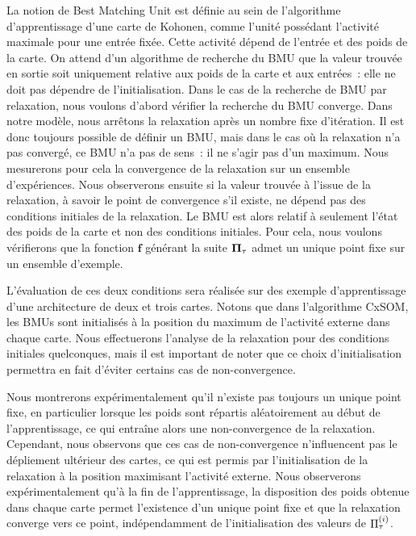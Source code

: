 \documentclass[../main]{subfiles}
\begin{document}
La notion de Best Matching Unit est définie au sein de l'algorithme d'apprentissage d'une carte de Kohonen, comme l'unité possédant l'activité maximale pour une entrée fixée. 
Cette activité dépend de l'entrée et des poids de la carte.
On attend d'un algorithme de recherche du BMU que la valeur trouvée en sortie soit uniquement relative aux poids de la carte et aux entrées~: elle ne doit pas dépendre de l'initialisation.
Dans le cas de la recherche de BMU par relaxation, nous voulons d'abord vérifier la recherche du BMU converge. 
Dans notre modèle, nous arrêtons la relaxation après un nombre fixe d'itération. Il est donc toujours possible de définir un BMU, mais dans le cas où la relaxation n'a pas convergé, ce BMU n'a pas de sens~: il ne s'agir pas d'un maximum. 
Nous mesurerons pour cela la convergence de la relaxation sur un ensemble d'expériences.
Nous observerons ensuite si la valeur trouvée à l'issue de la relaxation, à savoir le point de convergence s'il existe, ne dépend pas des conditions initiales de la relaxation.
Le BMU est alors relatif à seulement l'état des poids de la carte et non des conditions initiales. Pour cela, nous voulons vérifierons que la fonction $\mathbf{f}$ générant la suite $\mathbf{\Pi}_\tau$ admet un unique point fixe sur un ensemble d'exemple. 

L'évaluation de ces deux conditions sera réalisée sur des exemple d'apprentissage d'une architecture de deux et trois cartes. 
Notons que dans l'algorithme CxSOM, les BMUs sont initialisés à la position du maximum de l'activité externe dans chaque carte. 
Nous effectuerons l'analyse de la relaxation pour des conditions initiales quelconques, mais il est important de noter que ce choix d'initialisation permettra en fait d'éviter certains cas de non-convergence.

Nous montrerons expérimentalement qu'il n'existe pas toujours un unique point fixe, en particulier lorsque les poids sont répartis aléatoirement au début de l'apprentissage, ce qui entraîne alors une non-convergence de la relaxation. 
Cependant, nous observons que ces cas de non-convergence n'influencent pas le dépliement ultérieur des cartes, ce qui est permis par l'initialisation de la relaxation à la position maximisant l'activité externe.
Nous observerons expérimentalement qu'à la fin de l'apprentissage, la disposition des poids obtenue dans chaque carte permet l'existence d'un unique point fixe et que la relaxation converge vers ce point, indépendamment de l'initialisation des valeurs de $\Pi^{({i})}_{\tau}$.
\end{document}
